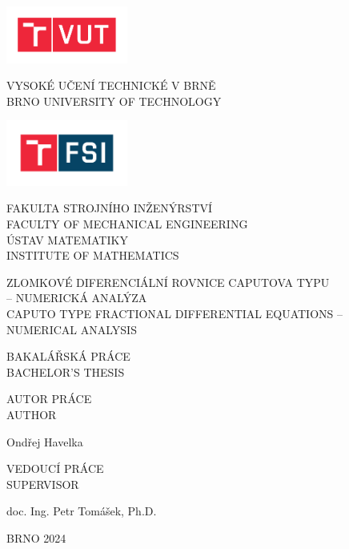 \documentclass[a4paper,12pt,twoside]{article}
\theoremstyle{definition}
\theoremstyle{remark}
\numberwithin{equation}{section}
\numberwithin{table}{section}
\numberwithin{figure}{section}
\newcommand{\tflarge}{\normalfont\sffamily\large\textmd}
\newcommand{\tfsmall}{\normalfont\sffamily\small\textmd}
\begin{document}
\thispagestyle{empty}
\noindent
\parbox[c]{4.2cm}{\includegraphics[width=4cm]{VUT.pdf}}
\parbox[c][1.5cm][t]{10cm}{\tflarge{VYSOKÉ UČENÍ TECHNICKÉ V BRNĚ}\\[0mm]\tfsmall{BRNO UNIVERSITY OF TECHNOLOGY}}

\vspace{1cm}\noindent
\parbox[c]{4.2cm}{\includegraphics[width=4cm]{FSI.pdf}}
\parbox[c][1.65cm][t]{10cm}{\tflarge{FAKULTA STROJNÍHO INŽENÝRSTVÍ}\\
\tfsmall{FACULTY OF MECHANICAL ENGINEERING}\\[3mm]
\tflarge{ÚSTAV MATEMATIKY}\\
\tfsmall{INSTITUTE OF MATHEMATICS}
}

\vspace{4cm}\noindent
{\normalfont\sffamily\Large\textmd{ZLOMKOVÉ DIFERENCIÁLNÍ ROVNICE CAPUTOVA TYPU \\[2mm]
		-- NUMERICKÁ ANALÝZA}}
\\[5mm]
{\normalfont\sffamily\textmd{CAPUTO TYPE FRACTIONAL DIFFERENTIAL EQUATIONS -- NUMERICAL ANALYSIS\\[0.5mm] }}
	
\vspace{5cm}\noindent
{\tflarge{BAKALÁŘSKÁ PRÁCE}}\\
{\tfsmall{BACHELOR'S THESIS}}

\vspace{1cm}\noindent
\parbox[t]{7.2cm}{\tflarge{AUTOR PRÁCE}\\ \tfsmall{AUTHOR}}\parbox[b]{5cm}{\tflarge{Ondřej Havelka}}

\vspace{1cm}\noindent
\parbox[t]{7.2cm}{\sf \large VEDOUCÍ PRÁCE\\ \small SUPERVISOR}\parbox[b]{8.3cm}{\sf \large doc. Ing. Petr Tomášek, Ph.D.}

\vspace{3.2cm}\noindent
{\sf BRNO 2024}
\end{document}
